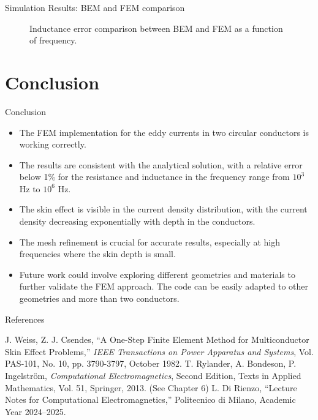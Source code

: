 \documentclass[aspectratio=54,xcolor=dvipsnames]{beamer}
\begin{document}
\begin{frame}{Simulation Results: BEM and FEM comparison}
\begin{center}
\begin{minipage}{0.49\textwidth}
\begin{figure}[H]
            \caption{Inductance error comparison between BEM and FEM as a function of frequency.}
        \end{figure}
    \end{minipage}
    \end{center}
\end{frame}

\section{Conclusion}
\begin{frame}{Conclusion}
    \begin{itemize}
        \item The FEM implementation for the eddy currents in two circular conductors is working correctly.
        \item The results are consistent with the analytical solution, with a relative error below 1\% for the resistance and inductance in the frequency range from $10^3$ Hz to $10^6$ Hz.
        \item The skin effect is visible in the current density distribution, with the current density decreasing exponentially with depth in the conductors.
        \item The mesh refinement is crucial for accurate results, especially at high frequencies where the skin depth is small.
        \item Future work could involve exploring different geometries and materials to further validate the FEM approach. The code can be easily adapted to other geometries and more than two conductors.
    \end{itemize}
\end{frame}

\begin{frame}{References}
    \footnotesize
    \begin{thebibliography}{99}
         J. Weiss, Z. J. Csendes, ``A One-Step Finite Element Method for Multiconductor Skin Effect Problems,'' \emph{IEEE Transactions on Power Apparatus and Systems}, Vol. PAS-101, No. 10, pp. 3790-3797, October 1982.
        T. Rylander, A. Bondeson, P. Ingelström, \emph{Computational Electromagnetics}, Second Edition, Texts in Applied Mathematics, Vol. 51, Springer, 2013. (See Chapter 6)
        L. Di Rienzo, ``Lecture Notes for Computational Electromagnetics,'' Politecnico di Milano, Academic Year 2024--2025.
    \end{thebibliography}
\end{frame}
\end{document}
